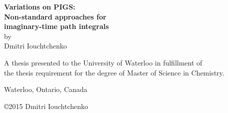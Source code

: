 \documentclass[11pt, twoside, final]{book}
\begin{document}
\frontmatter

\pagestyle{plain}

\begin{titlepage}
\begin{center}

\mbox{}\vfill
\vfill
\vfill

{ \LARGE \bfseries
	Variations on PIGS: \\[1 mm]
	Non-standard approaches for \\[1 mm]
	imaginary-time path integrals
} \\[5 mm]

by \\[5 mm]

{ \Large Dmitri Iouchtchenko }

\vfill
\vfill
\vfill

A thesis presented to the University of Waterloo in fulfillment of \\
the thesis requirement for the degree of Master of Science in Chemistry.

\vfill

Waterloo, Ontario, Canada

\vfill

\copyright 2015 Dmitri Iouchtchenko

\vfill

\end{center}
\end{titlepage}






\tableofcontents

\renewcommand{\nomname}{List of abbreviations}
\def\nomlabel#1{\hspace{5 mm}\textbf{#1}\hfil}
\printnomenclature[1 in]

\renewcommand{\listfigurename}{List of figures}
\listoffigures

\renewcommand{\listtablename}{List of tables}
\listoftables




\mainmatter

\pagestyle{fancy}







\appendix








\backmatter

\pagestyle{plain}

\printbibliography[title={References}, heading=bibnumbered, sorting=customsort]
\end{document}
